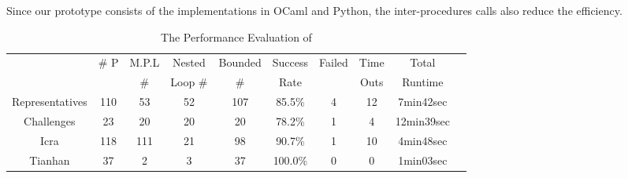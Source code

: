 Since our prototype consists of the implementations in OCaml and Python, the inter-procedures calls also reduce the efficiency.
%
%
\begin{table}[H]
 \vspace{-1cm}
    \caption{The Performance Evaluation of {\THESYSTEM}}
    \label{tb:performance-eval}
    \centering
        {\scriptsize
        \begin{tabular}{ >{\small}c | c | c | c | c | c | c | c | c | c }
            \multirow{2}{*}{Benchmarks} & \multirow{2}{*}{\# P}  & {M.P.L} & Nested  & {Bounded} & {Success} & \multirow{2}{*}{Failed} & Time  & Total\\
             &  & \# & Loop \# & \# & Rate &  & Outs &   Runtime \\
            \hline
                {Representatives} & {110}  & 53  & 52  & 107 & 85.5\% & 4 & 12 & 7min42sec \\
                \hline
                Challenges & 23  & 20 & 20 & {20} & {78.2\%}  & 1 & 4 & {12min39sec} \\
                \hline
                {Icra} & 118 & 111 & 21 & 98 & 90.7\% & 1 & 10 & {4min48sec} \\
                \hline
                Tianhan & 37 & 2 & 3 & 37 & 100.0\% & 0 & 0 & 1min03sec \\
                \hline
            \end{tabular}    
        }
 \vspace{-0.2cm}
    \end{table}
